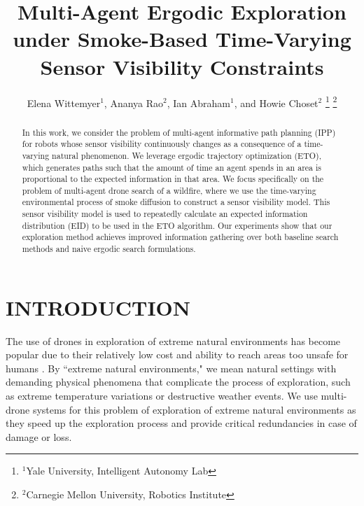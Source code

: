 \documentclass[letterpaper, 10 pt, conference]{ieeeconf}  %
\title{\LARGE \bf
Multi-Agent Ergodic Exploration under Smoke-Based Time-Varying Sensor Visibility Constraints
}
\author{Elena Wittemyer$^1$, Ananya Rao$^2$, Ian Abraham$^1$, and Howie Choset$^2$%
\thanks{$^1$Yale University, Intelligent Autonomy Lab}
\thanks{$^2$Carnegie Mellon University, Robotics Institute}
}
\begin{document}
\maketitle
\thispagestyle{empty}
\pagestyle{empty}

\begin{abstract}
In this work, we consider the problem of multi-agent informative path planning (IPP) for robots whose sensor visibility continuously changes as a consequence of a time-varying natural phenomenon. We leverage ergodic trajectory optimization (ETO), which generates paths such that the amount of time an agent spends in an area is proportional to the expected information in that area. We focus specifically on the problem of multi-agent drone search of a wildfire, where we use the time-varying environmental process of smoke diffusion to construct a sensor visibility model. This sensor visibility model is used to repeatedly calculate an expected information distribution (EID) to be used in the ETO algorithm. Our experiments show that our exploration method achieves improved information gathering over both baseline search methods and naive ergodic search formulations.
\end{abstract}
\section{INTRODUCTION}
The use of drones in exploration of extreme natural environments has become popular due to their relatively low cost and ability to reach areas too unsafe for humans \cite{daud2022applications}. By ``extreme natural environments," we mean natural settings with demanding physical phenomena that complicate the process of exploration, such as extreme temperature variations or destructive weather events. We use multi-drone systems for this problem of exploration of extreme natural environments as they speed up the exploration process and provide critical redundancies in case of damage or loss.

\end{document}

